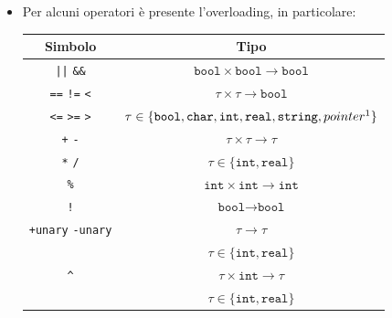 \documentclass{report}
\newcommand{\term}[1]{\texttt{#1}}
\begin{document}
\begin {itemize}
    \item Per alcuni operatori è presente l'overloading, in particolare:
        \begin{center}
        \begin{tabular}{ | c | c | }
            \hline
            \textbf{Simbolo}                        &       \textbf{Tipo}                                               \\
            \hline
            \term{||} \term{\&\&}                   &       $\term{bool} \times \term{bool} \rightarrow \term{bool}$    \\
            \hline
            \term{==} \term{!=} \term{<}            &       $\tau \times \tau \rightarrow \term{bool}$                  \\
            \term{<=} \term{>=} \term{>}            &       $\tau \in \{\term{bool}, \term{char}, \term{int}, \term{real}, \term{string}, pointer\footnotemark\}$    \\
            \hline
            \term{+} \term{-}                       &       $\tau \times \tau \rightarrow \tau$                         \\
            \term{*} \term{/}                       &       $\tau \in \{\term{int}, \term{real}\}$                      \\
            \hline
            \term{\%}                               &       $\term{int} \times \term{int} \rightarrow \term{int}$       \\
            \hline
            \term{!}                                &       $\term{bool} \rightarrow \term{bool}$                       \\
            \hline 
            \term{+unary} \term{-unary}             &       $\tau \rightarrow \tau$                                     \\
                                                    &       $\tau \in \{\term{int}, \term{real}\}$                      \\
            \hline
            \term{\^{}}                             &       $\tau \times \term{int} \rightarrow \tau$                   \\
                                                    &       $\tau \in \{\term{int}, \term{real}\}$                      \\
            \hline
        \end{tabular}
        \end{center}


\end{itemize}
\end{document}
